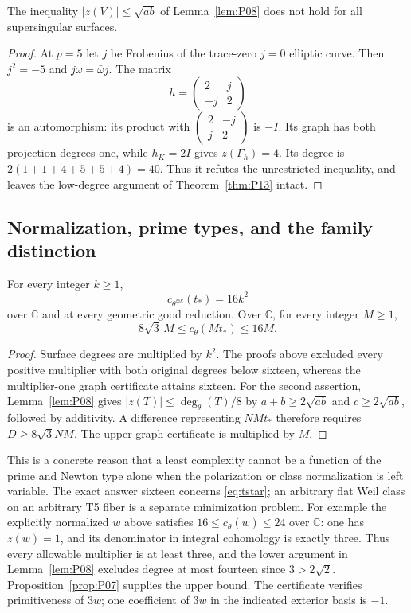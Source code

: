 \begin{proposition}
\label{prop:P14}
The inequality $|z(V)|\leq\sqrt{ab}$ of Lemma~\ref{lem:P08} does not hold for all supersingular surfaces.
\end{proposition}
\begin{proof}
At $p=5$ let $j$ be Frobenius of the trace-zero $j=0$ elliptic curve.  Then $j^2=-5$ and $j\omega=\bar\omega j$.  The matrix
\[
 h=\begin{pmatrix}2&j\\-j&2\end{pmatrix}
\]
is an automorphism: its product with $\left(\begin{smallmatrix}2&-j\\j&2\end{smallmatrix}\right)$ is $-I$.  Its graph has both projection degrees one, while $h_K=2I$ gives $z(\Gamma_h)=4$.  Its degree is $2(1+1+4+5+5+4)=40$.  Thus it refutes the unrestricted inequality, and leaves the low-degree argument of Theorem~\ref{thm:P13} intact.
\end{proof}

\subsection{Normalization, prime types, and the family distinction}

\begin{corollary}
\label{cor:P12}
For every integer $k\geq1$,
\[
 c_{\theta^{\otimes k}}(t_*)=16k^2
\]
over $\mathbb C$ and at every geometric good reduction.  Over $\mathbb C$, for every integer $M\geq1$,
\[
 8\sqrt3\,M\leq c_\theta(Mt_*)\leq16M.
\]
\end{corollary}
\begin{proof}
Surface degrees are multiplied by $k^2$.  The proofs above excluded every positive multiplier with both original degrees below sixteen, whereas the multiplier-one graph certificate attains sixteen.  For the second assertion, Lemma~\ref{lem:P08} gives $|z(T)|\leq\deg_\theta(T)/8$ by $a+b\geq2\sqrt{ab}$ and $c\geq2\sqrt{ab}$, followed by additivity.  A difference representing $NMt_*$ therefore requires $D\geq8\sqrt3 NM$.  The upper graph certificate is multiplied by $M$.
\end{proof}

This is a concrete reason that a least complexity cannot be a function of the prime and Newton type alone when the polarization or class normalization is left variable.  The exact answer sixteen concerns \eqref{eq:tstar}; an arbitrary flat Weil class on an arbitrary T5 fiber is a separate minimization problem.  For example the explicitly normalized $w$ above satisfies $16\leq c_\theta(w)\leq24$ over $\mathbb C$: one has $z(w)=1$, and its denominator in integral cohomology is exactly three.  Thus every allowable multiplier is at least three, and the lower argument in Lemma~\ref{lem:P08} excludes degree at most fourteen since $3>2\sqrt2$.  Proposition~\ref{prop:P07} supplies the upper bound.  The certificate verifies primitiveness of $3w$; one coefficient of $3w$ in the indicated exterior basis is $-1$.

